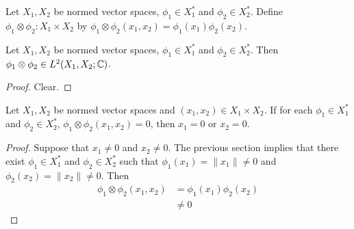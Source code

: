 \documentclass{book}
\begin{document}
	\begin{defn}
	Let $X_1, X_2$ be normed vector spaces, $\phi_1 \in X_1^*$ and $\phi_2 \in X_2^*$. Define $\phi_1 \otimes \phi_2: X_1 \times X_2$ by $\phi_1 \otimes \phi_2(x_1, x_2) = \phi_1(x_1)\phi_2(x_2)$. 
	\end{defn}
	
	\begin{ex}
	Let $X_1, X_2$ be normed vector spaces, $\phi_1 \in X_1^*$ and $\phi_2 \in X_2^*$. Then $\phi_1 \otimes \phi_2 \in L^2(X_1, X_2; \mathbb{C})$.
	\end{ex}
	
	\begin{proof}
	Clear.
	\end{proof}
	
	\begin{ex}
	Let $X_1, X_2$ be normed vector spaces and $(x_1, x_2) \in X_1 \times X_2$. If for each $\phi_1 \in X_1^*$ and $\phi_2 \in X_2^*$, $\phi_1 \otimes \phi_2 (x_1, x_2) = 0$, then $x_1 = 0$ or $x_2 = 0$. 
	\end{ex}
	
	\begin{proof}
	Suppose that $x_1 \neq 0$ and $x_2 \neq 0$. The previous section implies that there exist $\phi_1 \in X_1^*$ and $\phi_2 \in X_2^*$ such that $\phi_1(x_1) = \|x_1\| \neq 0$ and $\phi_2(x_2) = \|x_2\| \neq 0$. Then 
	\begin{align*}
	\phi_1 \otimes \phi_2 (x_1, x_2) 
	& = \phi_1(x_1) \phi_2(x_2) \\
	& \neq 0
	\end{align*}
	\end{proof}


















	
	
	
	











	
	
	
	
	
	
	
	
	
	
\end{document}
